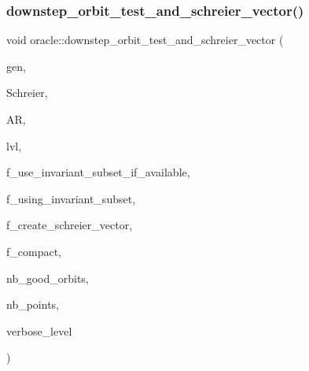 \subsubsection{\texorpdfstring{downstep\+\_\+orbit\+\_\+test\+\_\+and\+\_\+schreier\+\_\+vector()}{downstep\_orbit\_test\_and\_schreier\_vector()}}
{\footnotesize\ttfamily void oracle\+::downstep\+\_\+orbit\+\_\+test\+\_\+and\+\_\+schreier\+\_\+vector (\begin{DoxyParamCaption}\item[{\mbox{\hyperlink{classgenerator}{generator}} $\ast$}]{gen,  }\item[{\mbox{\hyperlink{classschreier}{schreier}} \&}]{Schreier,  }\item[{\mbox{\hyperlink{classaction}{action}} \&}]{AR,  }\item[{\mbox{\hyperlink{galois_8h_a09fddde158a3a20bd2dcadb609de11dc}{I\+NT}}}]{lvl,  }\item[{\mbox{\hyperlink{galois_8h_a09fddde158a3a20bd2dcadb609de11dc}{I\+NT}}}]{f\+\_\+use\+\_\+invariant\+\_\+subset\+\_\+if\+\_\+available,  }\item[{\mbox{\hyperlink{galois_8h_a09fddde158a3a20bd2dcadb609de11dc}{I\+NT}}}]{f\+\_\+using\+\_\+invariant\+\_\+subset,  }\item[{\mbox{\hyperlink{galois_8h_a09fddde158a3a20bd2dcadb609de11dc}{I\+NT}}}]{f\+\_\+create\+\_\+schreier\+\_\+vector,  }\item[{\mbox{\hyperlink{galois_8h_a09fddde158a3a20bd2dcadb609de11dc}{I\+NT}}}]{f\+\_\+compact,  }\item[{\mbox{\hyperlink{galois_8h_a09fddde158a3a20bd2dcadb609de11dc}{I\+NT}} \&}]{nb\+\_\+good\+\_\+orbits,  }\item[{\mbox{\hyperlink{galois_8h_a09fddde158a3a20bd2dcadb609de11dc}{I\+NT}} \&}]{nb\+\_\+points,  }\item[{\mbox{\hyperlink{galois_8h_a09fddde158a3a20bd2dcadb609de11dc}{I\+NT}}}]{verbose\+\_\+level }\end{DoxyParamCaption})}

\mbox{\label{classoracle_a65ea623f3a7b2e3dba4e29638207bc53}} 
